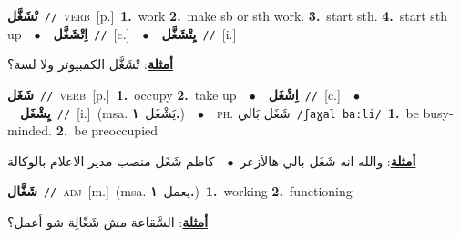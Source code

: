 \documentclass[10pt,a4paper,twoside]{article} %
\begin{document}
\begin{multicols}{2}
{\setlength\topsep{0pt}\textbf{\foreignlanguage{arabic}{تْشَغَّل}}\ {\color{gray}\texttt{//}\color{black}}\ \textsc{verb}\ [p.]\ \textbf{1.}~work  \textbf{2.}~make sb or sth work.  \textbf{3.}~start sth.  \textbf{4.}~start sth up\ \ $\bullet$\ \ \setlength\topsep{0pt}\textbf{\foreignlanguage{arabic}{اِتْشَغَّل}}\ {\color{gray}\texttt{//}\color{black}}\ [c.]\ \ $\bullet$\ \ \setlength\topsep{0pt}\textbf{\foreignlanguage{arabic}{يِتْشَغَّل}}\ {\color{gray}\texttt{//}\color{black}}\ [i.]\  \begin{flushright}\color{gray}\foreignlanguage{arabic}{\textbf{\underline{\foreignlanguage{arabic}{أمثلة}}}: تْشَغَّل الكمبيوتر ولا لسة؟}\end{flushright}\color{black}} \vspace{2mm}

{\setlength\topsep{0pt}\textbf{\foreignlanguage{arabic}{شَغَل}}\ {\color{gray}\texttt{//}\color{black}}\ \textsc{verb}\ [p.]\ \textbf{1.}~occupy  \textbf{2.}~take up\ \ $\bullet$\ \ \setlength\topsep{0pt}\textbf{\foreignlanguage{arabic}{اِشْغَل}}\ {\color{gray}\texttt{//}\color{black}}\ [c.]\ \ $\bullet$\ \ \setlength\topsep{0pt}\textbf{\foreignlanguage{arabic}{يِشْغَل}}\ {\color{gray}\texttt{//}\color{black}}\ [i.]\ \color{gray}(msa. \foreignlanguage{arabic}{يَشْغَل}~\foreignlanguage{arabic}{\textbf{١.}})\color{black}\ \ $\bullet$\ \ \textsc{ph.} \color{gray} \foreignlanguage{arabic}{شَغَل بَالي}\color{black}\ {\color{gray}\texttt{/{\sffamily ʃaɣal baːli}/}\color{black}}\ \textbf{1.}~be busy-minded.  \textbf{2.}~be preoccupied\  \begin{flushright}\color{gray}\foreignlanguage{arabic}{\textbf{\underline{\foreignlanguage{arabic}{أمثلة}}}: والله انه شَغَل بالي هالأزعر\ $\bullet$\ \  كاظم شَغَل منصب مدير الاعلام بالوكالة}\end{flushright}\color{black}} \vspace{2mm}

{\setlength\topsep{0pt}\textbf{\foreignlanguage{arabic}{شَغَّال}}\ {\color{gray}\texttt{//}\color{black}}\ \textsc{adj}\ [m.]\ \color{gray}(msa. \foreignlanguage{arabic}{يعمل}~\foreignlanguage{arabic}{\textbf{١.}})\color{black}\ \textbf{1.}~working  \textbf{2.}~functioning\  \begin{flushright}\color{gray}\foreignlanguage{arabic}{\textbf{\underline{\foreignlanguage{arabic}{أمثلة}}}: السَّقاعة مش شَغّالِة شو أعمل؟}\end{flushright}\color{black}} \vspace{2mm}


\end{multicols}
\end{document}
